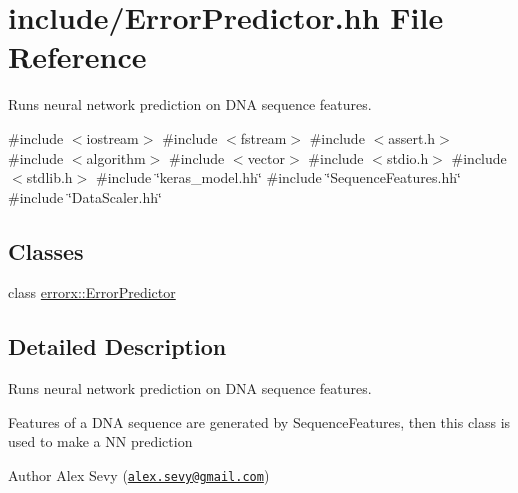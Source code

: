 \hypertarget{_error_predictor_8hh}{}\section{include/\+Error\+Predictor.hh File Reference}
\label{_error_predictor_8hh}


Runs neural network prediction on D\+NA sequence features.  


{\ttfamily \#include $<$iostream$>$}\newline
{\ttfamily \#include $<$fstream$>$}\newline
{\ttfamily \#include $<$assert.\+h$>$}\newline
{\ttfamily \#include $<$algorithm$>$}\newline
{\ttfamily \#include $<$vector$>$}\newline
{\ttfamily \#include $<$stdio.\+h$>$}\newline
{\ttfamily \#include $<$stdlib.\+h$>$}\newline
{\ttfamily \#include \char`\"{}keras\+\_\+model.\+hh\char`\"{}}\newline
{\ttfamily \#include \char`\"{}Sequence\+Features.\+hh\char`\"{}}\newline
{\ttfamily \#include \char`\"{}Data\+Scaler.\+hh\char`\"{}}\newline
\subsection*{Classes}
\begin{DoxyCompactItemize}
\item 
class \mbox{\hyperlink{classerrorx_1_1_error_predictor}{errorx\+::\+Error\+Predictor}}
\end{DoxyCompactItemize}


\subsection{Detailed Description}
Runs neural network prediction on D\+NA sequence features. 

Features of a D\+NA sequence are generated by Sequence\+Features, then this class is used to make a NN prediction \begin{DoxyAuthor}{Author}
Alex Sevy (\href{mailto:alex.sevy@gmail.com}{\tt alex.\+sevy@gmail.\+com}) 
\end{DoxyAuthor}
